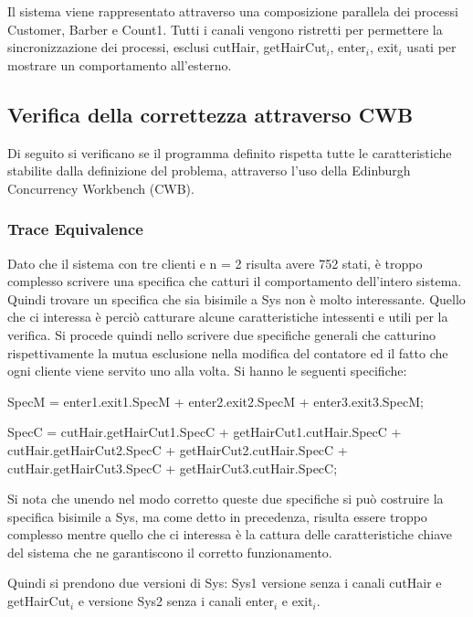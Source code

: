 Il sistema viene rappresentato attraverso una composizione parallela dei processi \textsf{Customer, Barber e Count1}. Tutti i canali vengono ristretti per permettere la sincronizzazione dei processi, esclusi \textsf{cutHair, getHairCut$_{i}$, enter$_{i}$, exit$_{i}$} usati per mostrare un comportamento all'esterno.

\subsection{Verifica della correttezza attraverso CWB}

Di seguito si verificano se il programma definito rispetta tutte le caratteristiche stabilite dalla definizione del problema, attraverso l'uso della Edinburgh Concurrency Workbench (CWB).

\subsubsection{Trace Equivalence} 

Dato che il sistema con tre clienti e n = 2 risulta avere 752 stati, è troppo complesso scrivere una specifica che catturi il comportamento dell'intero sistema. Quindi trovare un specifica che sia bisimile a \textsf{Sys} non è molto interessante. Quello che ci interessa è perciò catturare alcune caratteristiche intessenti e utili per la verifica. Si procede quindi nello scrivere due specifiche generali che catturino rispettivamente la mutua esclusione nella modifica del contatore ed il fatto che ogni cliente viene servito uno alla volta. Si hanno le seguenti specifiche:

\textsf{SpecM = enter1.exit1.SpecM + enter2.exit2.SpecM + enter3.exit3.SpecM;}

\textsf{SpecC = cutHair.getHairCut1.SpecC + getHairCut1.cutHair.SpecC + \\cutHair.getHairCut2.SpecC + getHairCut2.cutHair.SpecC + \\cutHair.getHairCut3.SpecC + getHairCut3.cutHair.SpecC;}

Si nota che unendo nel modo corretto queste due specifiche si può costruire la specifica bisimile a \textsf{Sys}, ma come detto in precedenza, risulta essere troppo complesso mentre quello che ci interessa è la cattura delle caratteristiche chiave del sistema che ne garantiscono il corretto funzionamento.

Quindi si prendono due versioni di \textsf{Sys}: \textsf{Sys1} versione senza i canali \textsf{cutHair} e \textsf{getHairCut$_{i}$} e versione \textsf{Sys2} senza i canali \textsf{enter$_{i}$} e \textsf{exit$_{i}$}.

